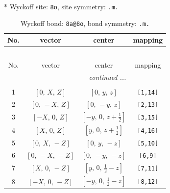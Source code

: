 \documentclass[fleqn,8pt]{jsarticle}
\begin{document}
* Wyckoff site: {\tt 8o}, site symmetry: {\tt .m.}
\renewcommand{\arraystretch}{1.2}
\begin{longtable}{cccc}
\caption{Wyckoff bond: {\tt 8a@8o}, bond symmetry: {\tt .m.}}
 \\
 \hline \hline
No. & vector & center & mapping \\ \hline \endfirsthead

\multicolumn{3}{l}{\tablename\ \thetable{}} \\
 \hline \hline
No. & vector & center & mapping \\ \hline \endhead

 \hline \hline
\multicolumn{3}{r}{\footnotesize\it continued ...} \\ \endfoot

 \hline \hline
\multicolumn{3}{r}{} \\ \endlastfoot

1 & $\left[ 0,\, X,\, Z \right]$ & $\left[ 0,\, y,\, z \right]$ & {\tt [1,14]} \\ \hline
2 & $\left[ 0,\, - X,\, Z \right]$ & $\left[ 0,\, - y,\, z \right]$ & {\tt [2,13]} \\ \hline
3 & $\left[ - X,\, 0,\, Z \right]$ & $\left[ - y,\, 0,\, z + \frac{1}{2} \right]$ & {\tt [3,15]} \\ \hline
4 & $\left[ X,\, 0,\, Z \right]$ & $\left[ y,\, 0,\, z + \frac{1}{2} \right]$ & {\tt [4,16]} \\ \hline
5 & $\left[ 0,\, X,\, - Z \right]$ & $\left[ 0,\, y,\, - z \right]$ & {\tt [5,10]} \\ \hline
6 & $\left[ 0,\, - X,\, - Z \right]$ & $\left[ 0,\, - y,\, - z \right]$ & {\tt [6,9]} \\ \hline
7 & $\left[ X,\, 0,\, - Z \right]$ & $\left[ y,\, 0,\, \frac{1}{2} - z \right]$ & {\tt [7,11]} \\ \hline
8 & $\left[ - X,\, 0,\, - Z \right]$ & $\left[ - y,\, 0,\, \frac{1}{2} - z \right]$ & {\tt [8,12]} \\
\end{longtable}
\renewcommand{\arraystretch}{1.2}
\end{document}
